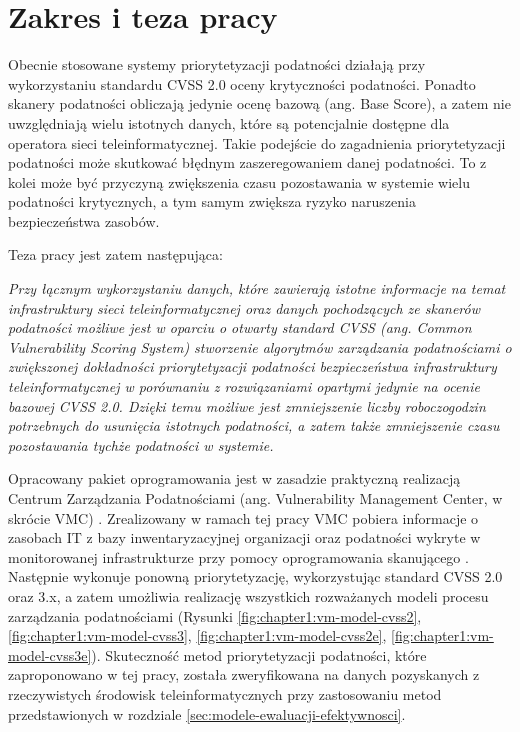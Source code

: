 
\section{Zakres i teza pracy}
\label{sec:zakres-i-teza-pracy}
Obecnie stosowane systemy priorytetyzacji podatności działają przy wykorzystaniu standardu CVSS 2.0 oceny krytyczności podatności. Ponadto skanery podatności obliczają jedynie ocenę bazową (ang. Base Score), a zatem nie uwzględniają wielu istotnych danych, które są potencjalnie dostępne dla operatora sieci teleinformatycznej. Takie podejście do zagadnienia priorytetyzacji podatności może skutkować błędnym zaszeregowaniem danej podatności. To z kolei może być przyczyną zwiększenia czasu pozostawania w systemie wielu podatności krytycznych, a tym samym zwiększa ryzyko naruszenia bezpieczeństwa zasobów.

\bigbreak
Teza pracy jest zatem następująca:

\bigbreak
\emph{Przy łącznym wykorzystaniu danych, które zawierają istotne informacje na temat infrastruktury sieci teleinformatycznej oraz danych pochodzących ze skanerów podatności możliwe jest w oparciu o otwarty standard CVSS (ang. Common Vulnerability Scoring System) stworzenie algorytmów zarządzania podatnościami o zwiększonej dokładności priorytetyzacji podatności bezpieczeństwa infrastruktury teleinformatycznej w porównaniu z rozwiązaniami opartymi jedynie na ocenie bazowej CVSS 2.0. Dzięki temu możliwe jest zmniejszenie liczby roboczogodzin potrzebnych do usunięcia istotnych podatności, a zatem także zmniejszenie czasu pozostawania tychże podatności w systemie.}

\bigbreak
Opracowany pakiet oprogramowania jest w zasadzie praktyczną realizacją Centrum Zarządzania Podatnościami (ang. Vulnerability Management Center, w skrócie VMC)  \cite{vmcgithub}. Zrealizowany w ramach tej pracy VMC pobiera informacje o zasobach IT z bazy inwentaryzacyjnej organizacji \cite{ralph} oraz podatności wykryte w monitorowanej infrastrukturze przy pomocy oprogramowania skanującego \cite{beale2004nessus, rahalkar2019openvas}. Następnie wykonuje ponowną priorytetyzację, wykorzystując standard CVSS 2.0 oraz 3.x, a zatem umożliwia realizację wszystkich rozważanych modeli procesu zarządzania podatnościami (Rysunki \ref{fig:chapter1:vm-model-cvss2}, \ref{fig:chapter1:vm-model-cvss3}, \ref{fig:chapter1:vm-model-cvss2e}, \ref{fig:chapter1:vm-model-cvss3e}).  Skuteczność metod priorytetyzacji podatności, które zaproponowano w tej pracy, została zweryfikowana na danych pozyskanych z rzeczywistych środowisk teleinformatycznych przy zastosowaniu metod przedstawionych w rozdziale \ref{sec:modele-ewaluacji-efektywnosci}. 

